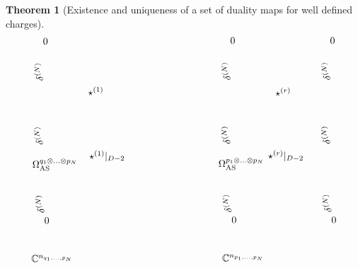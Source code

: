 \documentclass[a4paper,12pt]{article}
\newtheorem{Theorem}{Theorem}[section]
\begin{document}
\begin{Theorem}[Existence and uniqueness of a set of duality maps for well defined charges]
\begin{equation}
\begin{tikzpicture}[x=0.62pt,y=0.75pt,yscale=-1,xscale=1]
\draw (406.94,349.45) node [anchor=north west][inner sep=0.75pt]  [rotate=-268.92]  {$\delta ^{( N)}$};
\draw (421.09,352.75) node [anchor=north west][inner sep=0.75pt]  [rotate=-359.84]  {$0$};
\draw (399.8,273.26) node [anchor=north west][inner sep=0.75pt]  [rotate=-0.36]  {$\Omega _{\textnormal{AS}}^{p_{1} \otimes ...\otimes p_{N}}$};
\draw (418.95,110.98) node [anchor=north west][inner sep=0.75pt]  [rotate=-0.45]  {$0$};
\draw (404.69,257.3) node [anchor=north west][inner sep=0.75pt]  [rotate=-268.92]  {$\delta ^{( N)}$};
\draw (405.01,171.22) node [anchor=north west][inner sep=0.75pt]  [rotate=-268.92]  {$\delta ^{( N)}$};
\draw (101.55,350.32) node [anchor=north west][inner sep=0.75pt]  [rotate=-268.92]  {$\delta ^{( N)}$};
\draw (115.7,353.62) node [anchor=north west][inner sep=0.75pt]  [rotate=-359.84]  {$0$};
\draw (96.33,274.13) node [anchor=north west][inner sep=0.75pt]  [rotate=-0.36]  {$\Omega _{\textnormal{AS}}^{q_{1} \otimes ...\otimes p_{N}}$};
\draw (113.56,111.85) node [anchor=north west][inner sep=0.75pt]  [rotate=-0.45]  {$0$};
\draw (99.3,258.16) node [anchor=north west][inner sep=0.75pt]  [rotate=-268.92]  {$\delta ^{( N)}$};
\draw (99.62,172.09) node [anchor=north west][inner sep=0.75pt]  [rotate=-268.92]  {$\delta ^{( N)}$};
\draw (569.69,349.19) node [anchor=north west][inner sep=0.75pt]  [rotate=-268.92]  {$\delta ^{( N)}$};
\draw (583.84,352.75) node [anchor=north west][inner sep=0.75pt]  [rotate=-359.84]  {$0$};
\draw (581.7,110.98) node [anchor=north west][inner sep=0.75pt]  [rotate=-0.45]  {$0$};
\draw (567.43,257.3) node [anchor=north west][inner sep=0.75pt]  [rotate=-268.92]  {$\delta ^{( N)}$};
\draw (567.75,171.22) node [anchor=north west][inner sep=0.75pt]  [rotate=-268.92]  {$\delta ^{( N)}$};
\draw (492.52,178.04) node [anchor=north west][inner sep=0.75pt]    {$\star ^{( r)}$};
\draw (187.02,177.11) node [anchor=north west][inner sep=0.75pt]    {$\star ^{( 1)}$};
\draw (188.91,263.07) node [anchor=north west][inner sep=0.75pt]    {$\star ^{( 1)} |_{D-2}$};
\draw (480.5,262.74) node [anchor=north west][inner sep=0.75pt]    {$\star ^{( r)} |_{D-2}$};
\draw (405.68,403.49) node [anchor=north west][inner sep=0.75pt]    {$\mathbb{C}^{n_{p_{1} ,...,p_{N}}}$};
\draw (94.55,404.36) node [anchor=north west][inner sep=0.75pt]    {$\mathbb{C}^{n_{q_{1} ,...,p_{N}}}$};

\end{tikzpicture}
\end{equation}
\end{Theorem}
\end{document}
